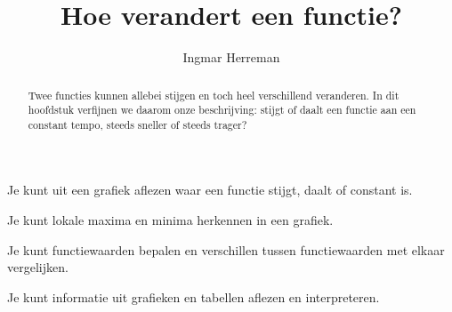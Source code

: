 \documentclass{ximera}
\title{Hoe verandert een functie?}
\author{Ingmar Herreman}
\begin{document}





\begin{abstract}
Twee functies kunnen allebei stijgen en toch heel verschillend veranderen.
In dit hoofdstuk verfijnen we daarom onze beschrijving: stijgt of daalt een functie
aan een constant tempo, steeds sneller of steeds trager?
\end{abstract}

\maketitle

\begin{voorkennis}

    \item Je kunt uit een grafiek aflezen waar een functie stijgt, daalt of constant is.
  
    \item Je kunt lokale maxima en minima herkennen in een grafiek.
  
    \item Je kunt functiewaarden bepalen en verschillen tussen functiewaarden met elkaar vergelijken.
  
    \item Je kunt informatie uit grafieken en tabellen aflezen en interpreteren.
  
  \end{voorkennis}
  
\end{document}
